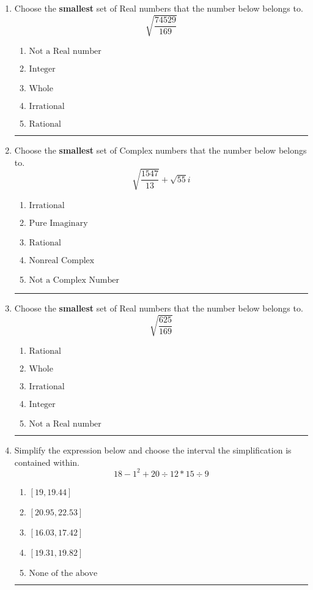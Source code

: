 \documentclass[14pt]{extbook}
\newcommand{\litem}[1]{\item#1\hspace*{-1cm}\rule{\textwidth}{0.4pt}}
\begin{document}
\begin{enumerate}
\litem{
Choose the \textbf{smallest} set of Real numbers that the number below belongs to.\[ \sqrt{\frac{74529}{169}} \]\begin{enumerate}[label=\Alph*.]
\item \( \text{Not a Real number} \)
\item \( \text{Integer} \)
\item \( \text{Whole} \)
\item \( \text{Irrational} \)
\item \( \text{Rational} \)

\end{enumerate} }
\litem{
Choose the \textbf{smallest} set of Complex numbers that the number below belongs to.\[ \sqrt{\frac{1547}{13}}+\sqrt{55} i \]\begin{enumerate}[label=\Alph*.]
\item \( \text{Irrational} \)
\item \( \text{Pure Imaginary} \)
\item \( \text{Rational} \)
\item \( \text{Nonreal Complex} \)
\item \( \text{Not a Complex Number} \)

\end{enumerate} }
\litem{
Choose the \textbf{smallest} set of Real numbers that the number below belongs to.\[ \sqrt{\frac{625}{169}} \]\begin{enumerate}[label=\Alph*.]
\item \( \text{Rational} \)
\item \( \text{Whole} \)
\item \( \text{Irrational} \)
\item \( \text{Integer} \)
\item \( \text{Not a Real number} \)

\end{enumerate} }
\litem{
Simplify the expression below and choose the interval the simplification is contained within.\[ 18 - 1^2 + 20 \div 12 * 15 \div 9 \]\begin{enumerate}[label=\Alph*.]
\item \( [19, 19.44] \)
\item \( [20.95, 22.53] \)
\item \( [16.03, 17.42] \)
\item \( [19.31, 19.82] \)
\item \( \text{None of the above} \)


\end{enumerate}}
\end{enumerate}
\end{document}
